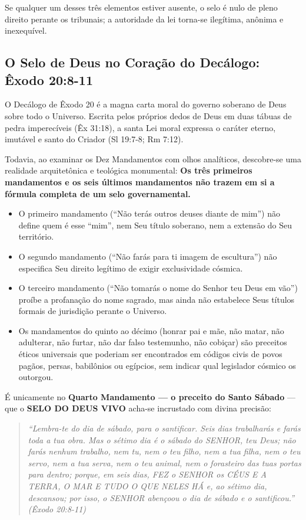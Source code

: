 \documentclass[11pt,a4paper,openany]{book}
\begin{document}
Se qualquer um desses três elementos estiver ausente, o selo é nulo de pleno direito perante os tribunais; a autoridade da lei torna-se ilegítima, anônima e inexequível.



\subsection{O Selo de Deus no Coração do Decálogo: Êxodo 20:8-11}


O Decálogo de Êxodo 20 é a magna carta moral do governo soberano de Deus sobre todo o Universo. Escrita pelos próprios dedos de Deus em duas tábuas de pedra imperecíveis (Êx 31:18), a santa Lei moral expressa o caráter eterno, imutável e santo do Criador (Sl 19:7-8; Rm 7:12).

Todavia, ao examinar os Dez Mandamentos com olhos analíticos, descobre-se uma realidade arquitetônica e teológica monumental: \textbf{Os três primeiros mandamentos e os seis últimos mandamentos não trazem em si a fórmula completa de um selo governamental.}

\begin{itemize}
  \item O primeiro mandamento (``Não terás outros deuses diante de mim'') não define quem é esse ``mim'', nem Seu título soberano, nem a extensão do Seu território.
  \item O segundo mandamento (``Não farás para ti imagem de escultura'') não especifica Seu direito legítimo de exigir exclusividade cósmica.
  \item O terceiro mandamento (``Não tomarás o nome do Senhor teu Deus em vão'') proíbe a profanação do nome sagrado, mas ainda não estabelece Seus títulos formais de jurisdição perante o Universo.
  \item Os mandamentos do quinto ao décimo (honrar pai e mãe, não matar, não adulterar, não furtar, não dar falso testemunho, não cobiçar) são preceitos éticos universais que poderiam ser encontrados em códigos civis de povos pagãos, persas, babilônios ou egípcios, sem indicar qual legislador cósmico os outorgou.
\end{itemize}


É unicamente no \textbf{Quarto Mandamento — o preceito do Santo Sábado} — que o \textbf{SELO DO DEUS VIVO} acha-se incrustado com divina precisão:


\begin{quote}
\itshape \textit{``Lembra-te do dia de sábado, para o santificar. Seis dias trabalharás e farás toda a tua obra. Mas o sétimo dia é o sábado do SENHOR, teu Deus; não farás nenhum trabalho, nem tu, nem o teu filho, nem a tua filha, nem o teu servo, nem a tua serva, nem o teu animal, nem o forasteiro das tuas portas para dentro; porque, em seis dias, FEZ o SENHOR os CÉUS E A TERRA, O MAR E TUDO O QUE NELES HÁ e, ao sétimo dia, descansou; por isso, o SENHOR abençoou o dia de sábado e o santificou.''} (Êxodo 20:8-11)
\end{quote}
\end{document}
